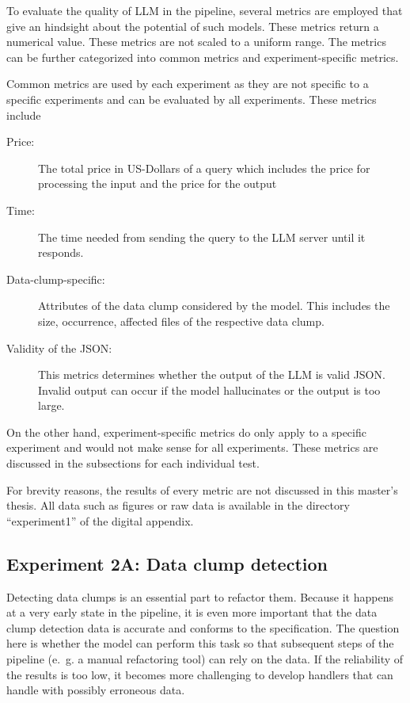 To evaluate the quality of \ac{LLM} in the pipeline, several metrics are employed that give an hindsight about the potential of such models. These metrics return a numerical value. These metrics are not scaled to a uniform range. The metrics can be further categorized into common metrics and experiment-specific metrics. 


Common metrics are used by each experiment as they are not specific to a specific experiments and can be evaluated by all experiments. These metrics include
\begin{description}
    \item [Price:] The total price in US-Dollars of a query which includes the price for processing the input and the price for the output
    \item [Time:] The time needed from sending the query to the \ac{LLM} server until it responds. 
    \item[ Data-clump-specific:] Attributes of the data clump considered by the model. This includes the size, occurrence, affected files of the respective data clump. 
    \item[Validity of the JSON:] This metrics determines whether the output of the \ac{LLM} is valid \ac{JSON}. Invalid output can occur if the model hallucinates or the output is too large.
\end{description}


On the other hand, experiment-specific metrics do only apply to a specific experiment and would not make sense for all experiments. These metrics are discussed in the subsections for each individual test. 

For brevity reasons, the results of every metric are not discussed in this master's thesis. All data such as figures or raw data is available in the directory \enquote{experiment1} of the digital appendix. 


\subsection{Experiment 2A: Data clump detection}

Detecting data clumps is an essential part to refactor them. Because it happens at a very early state in the pipeline, it is even more important that the data clump detection data is accurate and conforms to the specification. The question here is whether the model can perform this task so that subsequent steps of the pipeline (e.~g. a manual refactoring tool) can rely on the data. If the reliability of the results is too low, it becomes more challenging to develop  handlers that can handle with possibly erroneous data.

